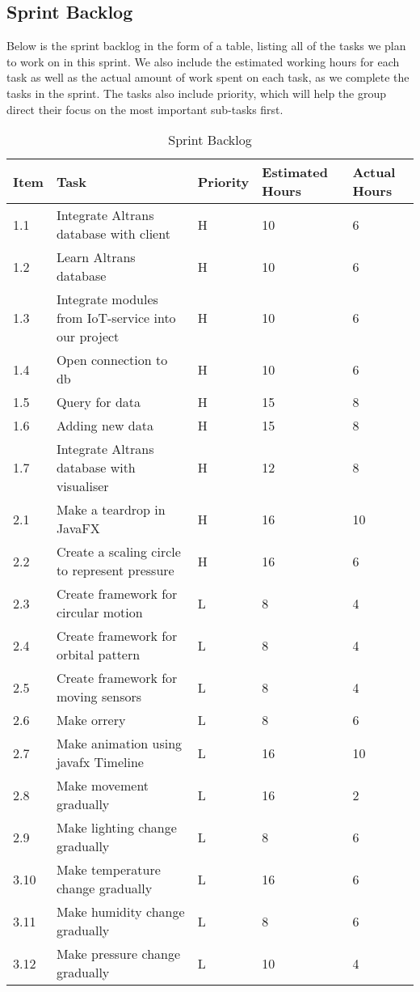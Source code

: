 \documentclass[../document]{subfiles}
\begin{document}
\subsection{Sprint Backlog}
Below is the sprint backlog in the form of a table, listing all of the tasks we plan to work on in this sprint. We also include the estimated working hours for each task as well as the actual amount of work spent on each task, as we complete the tasks in the sprint. The tasks also include priority, which will help the group direct their focus on the most important sub-tasks first.

\begin{table}[H]
\caption{Sprint Backlog}
\centering
\begin{tabularx}{\textwidth}{|l|X|l|l|l|}
\hline
Item
&Task
&Priority
&Estimated Hours
&Actual Hours
\\ \hline 1.1
&Integrate Altrans database with client
&H
&10
&6
\\ \hline 1.2
&Learn Altrans database
&H
&10
&6
\\ \hline 1.3
&Integrate modules from IoT-service into our project
&H
&10
&6
\\ \hline 1.4
&Open connection to db
&H
&10
&6
\\ \hline 1.5
&Query for data
&H
&15
&8
\\ \hline 1.6
&Adding new data
&H
&15
&8
\\ \hline 1.7
&Integrate Altrans database with visualiser
&H
&12
&8
\\ \hline 2.1
&Make a teardrop in JavaFX
&H
&16
&10
\\ \hline 2.2
&Create a scaling circle to represent pressure
&H
&16
&6
\\ \hline 2.3
&Create framework for circular motion
&L
&8
&4
\\ \hline 2.4
&Create framework for orbital pattern
&L
&8
&4
\\ \hline 2.5
&Create framework for moving sensors
&L
&8
&4
\\ \hline 2.6
&Make orrery
&L
&8
&6
\\ \hline 2.7
&Make animation using javafx Timeline
&L
&16
&10
\\ \hline 2.8
&Make movement gradually
&L
&16
&2
\\ \hline 2.9
&Make lighting change gradually
&L
&8
&6
\\ \hline 3.10
&Make temperature change gradually
&L
&16
&6
\\ \hline 3.11
&Make humidity change gradually
&L
&8
&6
\\ \hline 3.12
&Make pressure change gradually
&L
&10
&4
\\ \hline 
\end{tabularx}
\end{table}
\end{document}
